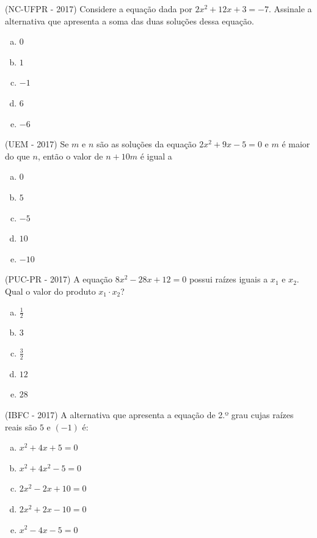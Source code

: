  \begin{exer}
 (NC-UFPR - 2017) Considere a equação dada por $2x^2 + 12x + 3 = -7$. Assinale a alternativa que apresenta a soma das duas soluções dessa equação.
 \begin{multicols}{5}
 \begin{enumerate}[a)]
 \item $0$
 \item $1$
 \item $-1$
 \item $6$
 \item $-6$
 \end{enumerate}
 \end{multicols}
 \end{exer}

 \begin{exer}
 (UEM - 2017) Se $m$ e $n$ são as soluções da equação  $2x^2 +9x - 5 = 0$  e $m$ é maior do que $n$, então o valor de $n +10m$ é igual a
 \begin{multicols}{5}
 \begin{enumerate}[a)]
 \item $0$
 \item $5$
 \item $-5$
 \item $10$
 \item $-10$
 \end{enumerate}
 \end{multicols}
 \end{exer}

 \begin{exer}
 (PUC-PR - 2017) A equação $8x^2 - 28x + 12 = 0$ possui raízes iguais a $x_1$ e $x_2$. Qual o valor do produto $x_1 \cdot x_2$?
 \begin{multicols}{5}
 \begin{enumerate}[a)]
 \item $\frac{1}{2}$
 \item $3$
 \item $\frac{3}{2}$
 \item $12$
 \item $28$
 \end{enumerate}
 \end{multicols}
 \end{exer}

 \begin{exer}
 (IBFC - 2017) A alternativa que apresenta a equação de 2.º grau cujas raízes reais são $5$ e $(-1)$ é:
 \begin{enumerate}[a)]
 \item $x^2 + 4x + 5 = 0$
 \item $x^2 + 4x^2 - 5 = 0$
 \item $2x^2 - 2x + 10 = 0$
 \item $2x^2 + 2x - 10 = 0$
 \item $x^2 - 4x - 5 = 0$
 \end{enumerate}
 \end{exer}

